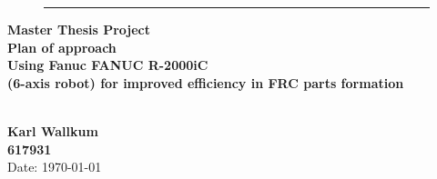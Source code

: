 \begin{titlepage}
	\begin{flushright}
	\begin{minipage}{\linewidth}
		\begin{figure}[H]
			\begin{flushright}
		\end{flushright}
		\hrule
		\end{figure}
		\begin{flushright}
			\large\textbf{Master Thesis Project}\\
			\vspace{20pt}
			\Huge\textbf{Plan of approach
			\\
			\vspace{10pt}
			Using Fanuc FANUC R-2000iC\\
			(6-axis robot) for improved efficiency in FRC parts formation }
		\end{flushright}
		\vspace{140pt}
		\begin{figure}[H]
		\begin{flushleft}
		\end{flushleft}	
		\end{figure}
		\begin{flushright}
			\LARGE \textbf
			{
			\\Karl Wallkum 
			\\617931
			}
			\\Date: \today			
		\end{flushright}
	\end{minipage}
	\end{flushright}

\end{titlepage}